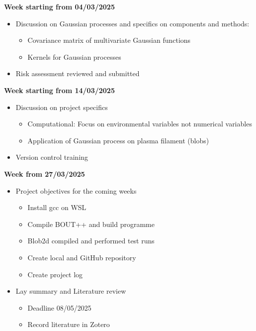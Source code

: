 \documentclass{article}
\begin{document}
\begin{arrowlist}
    \item \textbf{Week starting from 04/03/2025}
    \begin{itemize}
        \item Discussion on Gaussian processes and specifics on components and methods:
        \begin{itemize}
        	\item Covariance matrix of multivariate Gaussian functions
        	\item Kernels for Gaussian processes
        \end{itemize}
        \item Risk assessment reviewed and submitted
    \end{itemize}
    
    \item \textbf{Week starting from 14/03/2025}
    \begin{itemize}
        \item Discussion on project specifics
        \begin{itemize}
        	\item Computational: Focus on environmental variables not numerical variables
        	\item Application of Gaussian process on plasma filament (blobs)
        \end{itemize}
        \item Version control training
    \end{itemize}
    
    \item \textbf{Week from 27/03/2025}
    \begin{itemize}
        \item Project objectives for the coming weeks
        \begin{itemize}
        	\item Install gcc on WSL
        	\item Compile BOUT++ and build programme
        	  \item Blob2d compiled and performed test runs
        	\item Create local and GitHub repository	
        	\item Create project log
        \end{itemize}
        \item Lay summary and Literature review
        \begin{itemize}
        	\item Deadline 08/05/2025
        	\item  Record literature in Zotero
        \end{itemize}
    \end{itemize}
    

\end{arrowlist}
\end{document}
